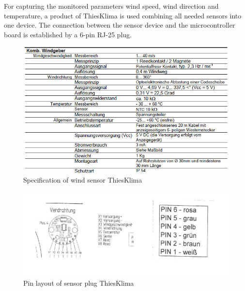 For capturing the monitored parameters wind speed, wind direction and temperature, a product of ThiesKlima is used combining all needed sensors into one device. The connection between the sensor device and the microcontroller board is established by a 6-pin RJ-25 plug.

\begin{figure}[ht]
    \centering
    \includegraphics[width=0.9\linewidth]{graphics/windsensor_specs.jpg}
    \caption{Specification of wind sensor \copy ThiesKlima}
    \label{fig:windsensor_spec}
\end{figure}
	
\begin{figure}[ht]
    \centering
    \includegraphics[width=0.8\linewidth]{graphics/windsensor_pinlayout.jpg}
    \caption{Pin layout of sensor plug \copy ThiesKlima}
    \label{fig:windsensor_pinlayout}
\end{figure}

\newpage